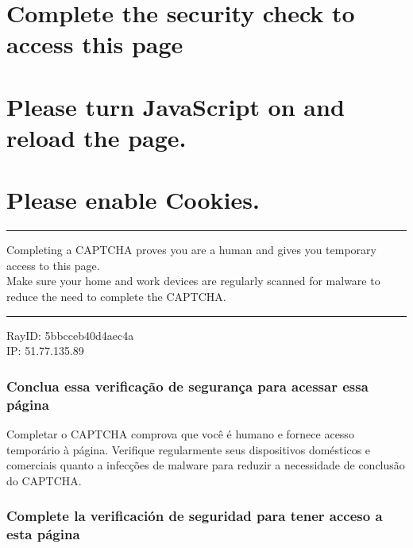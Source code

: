\hypertarget{complete-the-security-check-to-access-this-page}{%
\section{Complete the security check to access this
page}\label{complete-the-security-check-to-access-this-page}}

\hypertarget{please-turn-javascript-on-and-reload-the-page}{%
\section{Please turn JavaScript on and reload the
page.}\label{please-turn-javascript-on-and-reload-the-page}}

\hypertarget{please-enable-cookies}{%
\section{Please enable Cookies.}\label{please-enable-cookies}}

\begin{center}\rule{0.5\linewidth}{\linethickness}\end{center}

Completing a CAPTCHA proves you are a human and gives you temporary
access to this page.\\
Make sure your home and work devices are regularly scanned for malware
to reduce the need to complete the CAPTCHA.

\begin{center}\rule{0.5\linewidth}{\linethickness}\end{center}

RayID: 5bbcceb40d4aec4a\\
IP: 51.77.135.89

\hypertarget{conclua-essa-verificauxe7uxe3o-de-seguranuxe7a-para-acessar-essa-puxe1gina}{%
\subsubsection{Conclua essa verificação de segurança para acessar essa
página}\label{conclua-essa-verificauxe7uxe3o-de-seguranuxe7a-para-acessar-essa-puxe1gina}}

Completar o CAPTCHA comprova que você é humano e fornece acesso
temporário à página. Verifique regularmente seus dispositivos domésticos
e comerciais quanto a infecções de malware para reduzir a necessidade de
conclusão do CAPTCHA.

\hypertarget{complete-la-verificaciuxf3n-de-seguridad-para-tener-acceso-a-esta-puxe1gina}{%
\subsubsection{Complete la verificación de seguridad para tener acceso a
esta
página}\label{complete-la-verificaciuxf3n-de-seguridad-para-tener-acceso-a-esta-puxe1gina}}

